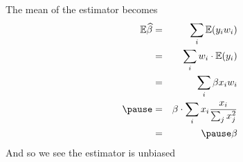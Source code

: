 \begin{frame}[fragile] \frametitle{}

The mean of the estimator becomes
\begin{eqnarray}
\mathbb{E} \widehat{\beta} &=& \sum_i \mathbb{E} (y_i w_i) \\
&=& \sum_i w_i \cdot \mathbb{E} (y_i) \\
&=& \sum_i \beta x_i w_i \\ \pause
&=& \beta \cdot \sum_i x_i \frac{x_i}{\sum_j x_j^2} \\
&=& \pause \beta
\end{eqnarray}
And so we see the estimator is unbiased

\end{frame}

\begin{frame}[fragile] \frametitle{}



\end{frame}















